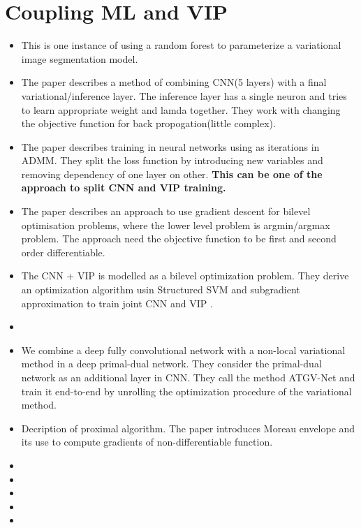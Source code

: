 \documentclass{article}
\begin{document}

\section{Coupling ML and VIP}

\begin{itemize}

\item {}
This is one instance of using a random forest to parameterize a variational image segmentation model.

\item {}
The paper describes a method of combining CNN(5 layers) with a final variational/inference layer. The inference layer has a single neuron and tries to learn appropriate weight and lamda together. They work with changing the objective function for back propogation(little complex).


\item {}
The paper describes training in neural networks using as iterations in ADMM. They split the loss function by introducing new variables and removing dependency of one layer on other. \textbf{This can be one of the approach to split CNN and VIP training.}

\item {}
The paper describes an approach to use gradient descent for bilevel optimisation problems, where the lower level problem is argmin/argmax problem. The approach need the objective function to be first and second order differentiable. 

\item {}
The CNN + VIP is modelled as a bilevel optimization problem. They derive an optimization algorithm usin Structured SVM and subgradient approximation to train joint CNN and VIP .

\item {}
\item {}
We combine a deep fully convolutional network with a non-local variational method in a deep primal-dual network. They consider the primal-dual network as an additional layer in CNN. They call the method ATGV-Net and train it end-to-end by unrolling the optimization procedure of the variational method.

\item {}
Decription of proximal algorithm. The paper introduces Moreau envelope and its use to compute gradients of non-differentiable function.


\item {}

\item {}

\item {}

\item {}

\item {}


\end{itemize}
\end{document}
